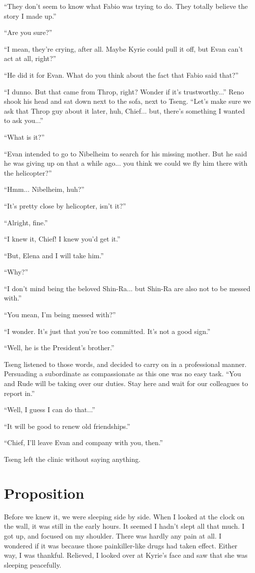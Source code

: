 \documentclass[oneside]{book}
\begin{document}
“They don’t seem to know what Fabio was trying to do. They totally believe the story I made up.”

“Are you sure?”

“I mean, they’re crying, after all. Maybe Kyrie could pull it off, but Evan can’t act at all, right?”

“He did it for Evan. What do you think about the fact that Fabio said that?”

“I dunno. But that came from Throp, right? Wonder if it’s trustworthy...” Reno shook his head and sat down next to the sofa, next to Tseng. “Let’s make sure we ask that Throp guy about it later, huh, Chief... but, there’s something I wanted to ask you...”

“What is it?”

“Evan intended to go to Nibelheim to search for his missing mother. But he said he was giving up on that a while ago... you think we could we fly him there with the helicopter?”

“Hmm... Nibelheim, huh?”

“It’s pretty close by helicopter, isn’t it?”

“Alright, fine.”

“I knew it, Chief! I knew you’d get it.”

“But, Elena and I will take him.”

“Why?”

“I don’t mind being the beloved Shin-Ra... but Shin-Ra are also not to be messed with.”

“You mean, I’m being messed with?”

“I wonder. It’s just that you’re too committed. It’s not a good sign.”

“Well, he is the President’s brother.”

Tseng listened to those words, and decided to carry on in a professional manner. Persuading a subordinate as compassionate as this one was no easy task. “You and Rude will be taking over our duties. Stay here and wait for our colleagues to report in.”

“Well, I guess I can do that...”

“It will be good to renew old friendships.”

“Chief, I’ll leave Evan and company with you, then.”

Tseng left the clinic without saying anything.


\chapter{Proposition}
Before we knew it, we were sleeping side by side. When I looked at the clock on the wall, it was still in the early hours. It seemed I hadn’t slept all that much. I got up, and focused on my shoulder. There was hardly any pain at all. I wondered if it was because those painkiller-like drugs had taken effect. Either way, I was thankful. Relieved, I looked over at Kyrie’s face and saw that she was sleeping peacefully.
\end{document}
